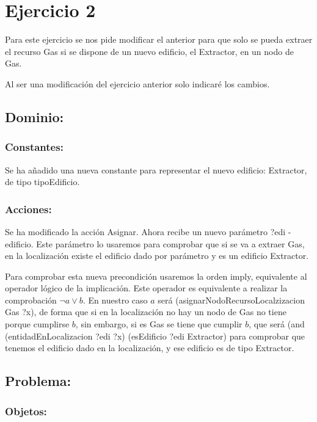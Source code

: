 \documentclass[10pt, spanish]{article}
\begin{document}
\section{Ejercicio 2}

Para este ejercicio se nos pide modificar el anterior para que solo se pueda extraer el recurso Gas si se dispone de un nuevo edificio, el Extractor, en un nodo de Gas.

Al ser una modificación del ejercicio anterior solo indicaré los cambios.

\subsection{Dominio:}

\subsubsection{Constantes:}

Se ha añadido una nueva constante para representar el nuevo edificio: Extractor, de tipo tipoEdificio.

\subsubsection{Acciones:}

Se ha modificado la acción Asignar. Ahora recibe un nuevo parámetro ?edi - edificio. Este parámetro lo usaremos para comprobar que si se va a extraer Gas, en la localización existe el edificio dado por parámetro y es un edificio Extractor.

Para comprobar esta nueva precondición usaremos la orden imply, equivalente al operador lógico de la implicación. Este operador es equivalente a realizar la comprobación $\neg a \lor b$. En nuestro caso $a$ será  (asignarNodoRecursoLocalzizacion Gas ?x), de forma que si en la localización no hay un nodo de Gas no tiene porque cumplirse $b$, sin embargo, si es Gas se tiene que cumplir $b$, que será (and (entidadEnLocalizacion ?edi ?x) (esEdificio ?edi Extractor) para comprobar que tenemos el edificio dado en la localización, y ese edificio es de tipo Extractor.

\subsection{Problema:}

\subsubsection{Objetos:}
\end{document}
